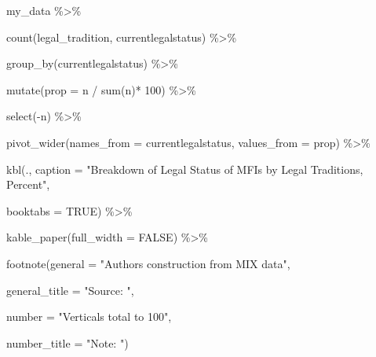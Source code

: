 \documentclass[a4paper,nobind]{templates/ociamthesis}
\newenvironment{Shaded}{\begin{snugshade}}{\end{snugshade}}
\newcommand{\AttributeTok}[1]{\textcolor[rgb]{0.77,0.63,0.00}{#1}}
\newcommand{\ConstantTok}[1]{\textcolor[rgb]{0.00,0.00,0.00}{#1}}
\newcommand{\DecValTok}[1]{\textcolor[rgb]{0.00,0.00,0.81}{#1}}
\newcommand{\FunctionTok}[1]{\textcolor[rgb]{0.00,0.00,0.00}{#1}}
\newcommand{\NormalTok}[1]{#1}
\newcommand{\SpecialCharTok}[1]{\textcolor[rgb]{0.00,0.00,0.00}{#1}}
\newcommand{\StringTok}[1]{\textcolor[rgb]{0.31,0.60,0.02}{#1}}
\renewenvironment{Shaded}
{
  \vspace{10pt}%
  \begin{snugshade}%
}{%
  \end{snugshade}%
  \vspace{8pt}%
}
\begin{document}
\begin{Shaded}
\begin{Highlighting}[]
\NormalTok{my\_data }\SpecialCharTok{\%\textgreater{}\%} 
  
  \FunctionTok{count}\NormalTok{(legal\_tradition, currentlegalstatus) }\SpecialCharTok{\%\textgreater{}\%} 
  
  \FunctionTok{group\_by}\NormalTok{(currentlegalstatus) }\SpecialCharTok{\%\textgreater{}\%} 
  
  \FunctionTok{mutate}\NormalTok{(}\AttributeTok{prop =}\NormalTok{ n }\SpecialCharTok{/} \FunctionTok{sum}\NormalTok{(n)}\SpecialCharTok{*} \DecValTok{100}\NormalTok{) }\SpecialCharTok{\%\textgreater{}\%} 
  
  \FunctionTok{select}\NormalTok{(}\SpecialCharTok{{-}}\NormalTok{n) }\SpecialCharTok{\%\textgreater{}\%} 

  \FunctionTok{pivot\_wider}\NormalTok{(}\AttributeTok{names\_from =}\NormalTok{ currentlegalstatus, }\AttributeTok{values\_from =}\NormalTok{ prop) }\SpecialCharTok{\%\textgreater{}\%} 
  
  \FunctionTok{kbl}\NormalTok{(., }\AttributeTok{caption =} \StringTok{"Breakdown of Legal Status of MFIs by Legal Traditions, Percent"}\NormalTok{, }
      
      \AttributeTok{booktabs =} \ConstantTok{TRUE}\NormalTok{) }\SpecialCharTok{\%\textgreater{}\%} 
  
  \FunctionTok{kable\_paper}\NormalTok{(}\AttributeTok{full\_width =} \ConstantTok{FALSE}\NormalTok{) }\SpecialCharTok{\%\textgreater{}\%} 
  
  \FunctionTok{footnote}\NormalTok{(}\AttributeTok{general =} \StringTok{"Authors\textquotesingle{} construction from MIX data"}\NormalTok{,}
           
           \AttributeTok{general\_title =} \StringTok{"Source: "}\NormalTok{,}
           
           \AttributeTok{number =} \StringTok{"Verticals total to 100"}\NormalTok{,}
           
           \AttributeTok{number\_title =} \StringTok{"Note: "}\NormalTok{)}
\end{Highlighting}
\end{Shaded}
\end{document}
